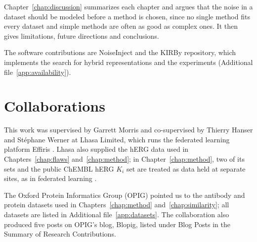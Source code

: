 Chapter~\ref{chap:discussion} summarizes each chapter and argues that the noise in a dataset should be modeled before a method is chosen, since no single method fits every dataset and simple methods are often as good as complex ones. It then gives limitations, future directions and conclusions. %

The software contributions are NoiseInject and the KIRBy repository, which implements the search for hybrid representations and the experiments (Additional file~\ref{app:availability}).


\section{Collaborations}


This work was supervised by Garrett Morris and co-supervised by Thierry Hanser and St\'ephane Werner at Lhasa Limited, which runs the federated learning platform Effiris \citep{Bassani2023}. Lhasa also supplied the hERG data used in Chapters~\ref{chap:flaws} and~\ref{chap:method}; in Chapter~\ref{chap:method}, two of its sets and the public ChEMBL hERG $K_i$ set are treated as data held at separate sites, as in federated learning \citep{Bassani2023, Hanser2023}.

The Oxford Protein Informatics Group (OPIG) pointed us to the antibody and protein datasets used in Chapters~\ref{chap:method} and~\ref{chap:similarity}; all datasets are listed in Additional file~\ref{app:datasets}. The collaboration also produced five posts on OPIG's blog, Blopig, listed under Blog Posts in the Summary of Research Contributions.

